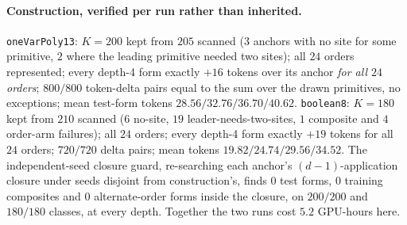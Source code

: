\paragraph{Construction, verified per run rather than inherited.} \texttt{oneVarPoly13}: $K{=}200$ kept from $205$ scanned ($3$ anchors with no site for some primitive, $2$ where the leading primitive needed two sites); all $24$ orders represented; every depth-4 form exactly $+16$ tokens over its anchor \emph{for all $24$ orders}; $800/800$ token-delta pairs equal to the sum over the drawn primitives, no exceptions; mean test-form tokens $28.56/32.76/36.70/40.62$. \texttt{boolean8}: $K{=}180$ kept from $210$ scanned ($6$ no-site, $19$ leader-needs-two-sites, $1$ composite and $4$ order-arm failures); all $24$ orders; every depth-4 form exactly $+19$ tokens for all $24$ orders; $720/720$ delta pairs; mean tokens $19.82/24.74/29.56/34.52$. The independent-seed closure guard, re-searching each anchor's $(d{-}1)$-application closure under seeds disjoint from construction's, finds $0$ test forms, $0$ training composites and $0$ alternate-order forms inside the closure, on $200/200$ and $180/180$ classes, at every depth. Together the two runs cost $5.2$ GPU-hours here.

